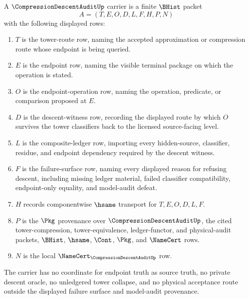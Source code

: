 \begin{definition}
\label{def:compression-descent-audit-carrier}
A $\CompressionDescentAuditUp$ carrier is a finite $\BHist$ packet
$$
A=(T,E,O,D,L,F,H,P,N)
$$
with the following displayed rows:
\begin{enumerate}
\item $T$ is the tower-route row, naming the accepted approximation or compression route whose endpoint is being queried.
\item $E$ is the endpoint row, naming the visible terminal package on which the operation is stated.
\item $O$ is the endpoint-operation row, naming the operation, predicate, or comparison proposed at $E$.
\item $D$ is the descent-witness row, recording the displayed route by which $O$ survives the tower classifiers back to the licensed source-facing level.
\item $L$ is the composite-ledger row, importing every hidden-source, classifier, residue, and endpoint dependency required by the descent witness.
\item $F$ is the failure-surface row, naming every displayed reason for refusing descent, including missing ledger material, failed classifier compatibility, endpoint-only equality, and model-audit defeat.
\item $H$ records componentwise $\hsame$ transport for $T,E,O,D,L,F$.
\item $P$ is the $\Pkg$ provenance over $\CompressionDescentAuditUp$, the cited tower-compression, tower-equivalence, ledger-functor, and physical-audit packets, $\BHist$, $\hsame$, $\Cont$, $\Pkg$, and $\NameCert$ rows.
\item $N$ is the local $\NameCert_{\CompressionDescentAuditUp}$ row.
\end{enumerate}
The carrier has no coordinate for endpoint truth as source truth, no private descent oracle, no unledgered tower collapse, and no physical acceptance route outside the displayed failure surface and model-audit provenance.
\end{definition}

